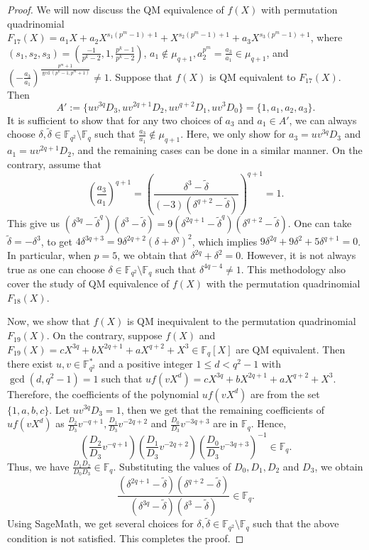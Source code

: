 \documentclass[12pt]{amsart}
\numberwithin{equation}{section}
\theoremstyle{definition}
\newcommand{\F}{\mathbb F}
\begin{document}
\begin{proof}
We will now discuss the QM equivalence of $f(X)$ with permutation quadrinomial $F_{17}(X)=a_1X+a_2X^{s_1(p^m-1)+1}+X^{s_2(p^m-1)+1}+a_3X^{s_3(p^m-1)+1}$, where   $(s_1,s_2,s_3)=(\frac{-1}{p^k-2},1,\frac{p^k-1}{p^k-2})$, $a_1 \notin \mu_{q+1}, a_2^{p^m}=\frac{a_3}{a_1}\in \mu_{q+1}$, and $\left(-\frac{a_3}{a_1}\right)^{\frac{p^{m}+1}{\gcd(p^k-1,p^m+1)}}\neq 1$.
 Suppose that $f(X)$ is QM equivalent to $F_{17}(X)$. Then
 \[
    A' := \{uv^{3q}D_3, uv^{2q+1}D_2, uv^{q+2}D_1, uv^3 D_0\} = \{1, a_1, a_2, a_3\} .
\]
It is sufficient to show that for any two choices of $a_3$ and $a_1 \in A'$, we can always choose $\delta, \tilde \delta \in \F_{q^2} \setminus \F_q$ such that $\frac{a_3}{a_1} \not \in \mu_{q+1}$. Here, we only show for $a_3=uv^{3q}D_3$ and $a_1=uv^{2q+1}D_2$, and the remaining cases can be done in a similar manner. On the contrary, assume that 
\[
\left(\dfrac{a_3}{a_1}\right)^{q+1}=\left(\dfrac{\delta^3-\tilde\delta}{(-3)(\delta^{q+2}-\tilde\delta)}\right)^{q+1}=1.
\]
 This give us $(\delta^{3q}-\tilde \delta^q)(\delta^3-\tilde\delta)=9(\delta^{2q+1}-\tilde \delta^q)(\delta^{q+2}-\tilde\delta)$. One can take $\tilde \delta=-\delta^3$, to get $4\delta^{3q+3}=9\delta^{2q+2}(\delta+\delta^q)^2$, which implies $9\delta^{2q}+9\delta^{2}+5\delta^{q+1}=0$.  In particular, when $p=5$, we obtain that $\delta^{2q}+\delta^2=0$. However, it is not always true as one can choose $\delta \in \F_{q^2}\setminus \F_{q}$ such that $\delta^{4q-4}\neq 1$.  This methodology also cover the study of QM equivalence of $f(X)$ with the permutation quadrinomial $F_{18}(X)$.
 
Now, we show that $f(X)$ is QM inequivalent to the permutation quadrinomial $F_{19}(X)$. On the contrary, suppose $f(X)$ and $F_{19}(X)=cX^{3q}+bX^{2q+1}+aX^{q+2}+X^3 \in \F_q[X]$ are QM equivalent. Then there exist $u,v \in \F_{q^2}^{*}$ and a positive integer $1 \leq d < q^2-1$ with $\gcd(d,q^2-1)=1$ such that $uf(vX^d)=cX^{3q}+bX^{2q+1}+aX^{q+2}+X^3.$ Therefore, the coefficients of the polynomial $uf(vX^d)$ are from the set $\{1,a,b,c\}$. Let $uv^{3q}D_3=1$, then we get that the remaining coefficients of $uf(vX^d)$ as $\frac{D_2}{D_3} v^{-q+1},  \frac{D_1}{D_3} v^{-2q+2}$ and $\frac{D_0}{D_3} v^{-3q+3}$ are in $\F_q$. Hence, $$\left(\frac{D_2}{D_3} v^{-q+1}\right) \left(\frac{D_1}{D_3} v^{-2q+2}\right)  \left(\frac{D_0}{D_3} v^{-3q+3}\right)^{-1} \in \F_q.$$
 Thus, we have $\frac{D_1 D_2}{D_0 D_3} \in \F_q$. Substituting the values of $D_0, D_1, D_2$ and $D_3$, we obtain 
 $$\dfrac{(\delta^{2q+1}-\tilde\delta)(\delta^{q+2}-\tilde\delta)}{(\delta^{3q}-\tilde\delta)(\delta^{3}-\tilde\delta)} \in \F_q.$$
Using SageMath, we get several choices for $\delta, \tilde \delta \in \F_{q^2} \setminus \F_q$ such that the above condition is not satisfied.
This completes the proof.
\end{proof}
\end{document}
